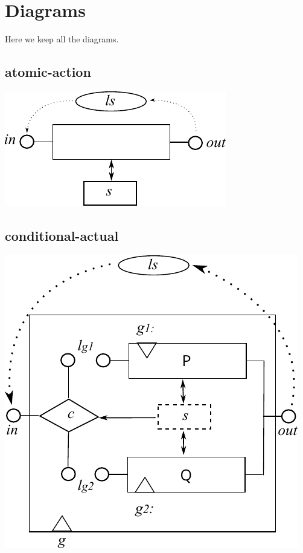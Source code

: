 \section{Diagrams}


Here we keep all the diagrams.

\subsection{atomic-action}
\includegraphics{images/atomic-action}

\subsection{conditional-actual}
\includegraphics{images/conditional-actual}

